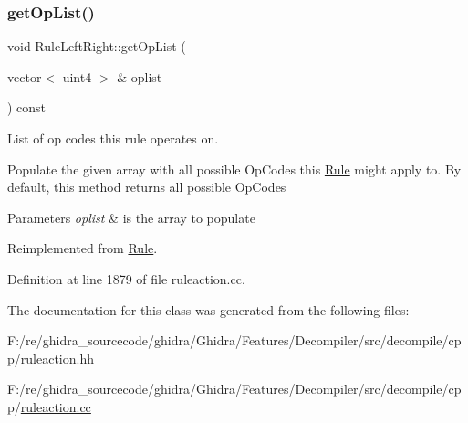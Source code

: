 \subsubsection{\texorpdfstring{getOpList()}{getOpList()}}
{\footnotesize\ttfamily void Rule\+Left\+Right\+::get\+Op\+List (\begin{DoxyParamCaption}\item[{vector$<$ uint4 $>$ \&}]{oplist }\end{DoxyParamCaption}) const\hspace{0.3cm}{\ttfamily [virtual]}}



List of op codes this rule operates on. 

Populate the given array with all possible Op\+Codes this \mbox{\hyperlink{class_rule}{Rule}} might apply to. By default, this method returns all possible Op\+Codes 
\begin{DoxyParams}{Parameters}
{\em oplist} & is the array to populate \\
\hline
\end{DoxyParams}


Reimplemented from \mbox{\hyperlink{class_rule_a4023bfc7825de0ab866790551856d10e}{Rule}}.



Definition at line 1879 of file ruleaction.\+cc.



The documentation for this class was generated from the following files\+:\begin{DoxyCompactItemize}
\item 
F\+:/re/ghidra\+\_\+sourcecode/ghidra/\+Ghidra/\+Features/\+Decompiler/src/decompile/cpp/\mbox{\hyperlink{ruleaction_8hh}{ruleaction.\+hh}}\item 
F\+:/re/ghidra\+\_\+sourcecode/ghidra/\+Ghidra/\+Features/\+Decompiler/src/decompile/cpp/\mbox{\hyperlink{ruleaction_8cc}{ruleaction.\+cc}}\end{DoxyCompactItemize}
